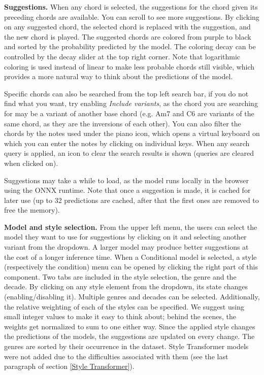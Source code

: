 \documentclass{article}
\begin{document}
\textbf{Suggestions.} When any chord is selected, the suggestions for the chord given its preceding chords are available. You can scroll to see more suggestions. By clicking on any suggested chord, the selected chord is replaced with the suggestion, and the new chord is played. The suggested chords are colored from purple to black and sorted by the probability predicted by the model. The coloring decay can be controlled by the decay slider at the top right corner. Note that logarithmic coloring is used instead of linear to make less probable chords still visible, which provides a more natural way to think about the predictions of the model.

Specific chords can also be searched from the top left search bar, if you do not find what you want, try enabling \textit{Include variants}, as the chord you are searching for may be a variant of another base chord (e.g. Am7 and C6 are variants of the same chord, as they are the inversions of each other). You can also filter the chords by the notes used under the piano icon, which opens a virtual keyboard on which you can enter the notes by clicking on individual keys. When any search query is applied, an icon to clear the search results is shown (queries are cleared when clicked on).

Suggestions may take a while to load, as the model runs locally in the browser using the ONNX runtime. Note that once a suggestion is made, it is cached for later use (up to 32 predictions are cached, after that the first ones are removed to free the memory).

\textbf{Model and style selection.} From the upper left menu, the users can select the model they want to use for suggestions by clicking on it and selecting another variant from the dropdown. A larger model may produce better suggestions at the cost of a longer inference time. When a Conditional model is selected, a style (respectively the condition) menu can be opened by clicking the right part of this component. Two tabs are included in the style selection, the genre and the decade. By clicking on any style element from the dropdown, its state changes (enabling/disabling it). Multiple genres and decades can be selected. Additionally, the relative weighting of each of the styles can be specified. We suggest using small integer values to make it easy to think about; behind the scenes, the weights get normalized to sum to one either way. Since the applied style changes the predictions of the models, the suggestions are updated on every change. The genres are sorted by their occurrence in the dataset. Style Transformer models were not added due to the difficulties associated with them (see the last paragraph of section \ref{Style Transformer}). 
\end{document}
